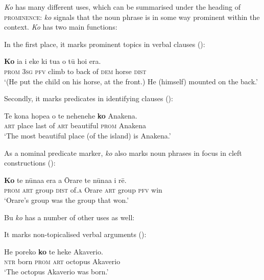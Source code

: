 \textit{Ko} has many different uses, which can be summarised under the heading of \textsc{prominence}: \textit{ko} signals that the noun phrase is in some way prominent within the context. \textit{Ko} has two main functions:

In the first place, it marks prominent topics in verbal clauses ():

\ea\label{ex:4.311}
\gll \textbf{Ko} ia i eke ki tu{\ꞌ}a o tū hoi era.\\
\textsc{prom} \textsc{3sg} \textsc{pfv} climb to back of \textsc{dem} horse \textsc{dist}\\

\glt
‘(He put the child on his horse, at the front.) He (himself) mounted on the back.’ \textstyleExampleref{[R399.046]} 
\z

Secondly, it marks predicates in identifying clauses (): 

\ea\label{ex:4.312}
\gll Te kona hope{\ꞌ}a o te nehenehe \textbf{ko} {\ꞌ}Anakena. \\
\textsc{art} place last of \textsc{art} beautiful \textsc{prom} Anakena \\

\glt
‘The most beautiful place (of the island) is Anakena.’ \textstyleExampleref{[R350.013]} 
\z

As a nominal predicate marker, \textit{ko} also marks noun phrases in focus in cleft constructions ():

\ea\label{ex:4.313}
\gll \textbf{Ko} te nūna{\ꞌ}a era {\ꞌ}a {\ꞌ}Ōrare te nūna{\ꞌ}a i rē. \\
\textsc{prom} \textsc{art} group \textsc{dist} of\textsc{.a} Orare \textsc{art} group \textsc{pfv} win \\

\glt
‘Orare’s group was the group that won.’ \textstyleExampleref{[R539-3.313]}
\z

Bu \textit{ko} has a number of other uses as well:

It marks non-topicalised verbal arguments ():

\ea\label{ex:4.314}
\gll He poreko \textbf{ko} te heke {\ꞌ}Akaverio. \\
\textsc{ntr} born \textsc{prom} \textsc{art} octopus Akaverio \\

\glt
‘The octopus Akaverio was born.’ \textstyleExampleref{[Mtx-7-14.003]}
\z

